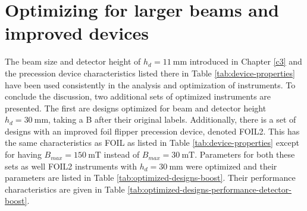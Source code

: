 \section{Optimizing for larger beams and improved devices}
The beam size and detector height of $h_d = \SI{11}{\milli\meter}$ introduced in Chapter \ref{c3} and the precession device characteristics listed there in Table \ref{tab:device-properties} have been used consistently in the analysis and optimization of instruments. To conclude the discussion, two additional sets of optimized instruments are presented. The first are designs optimized for beam and detector height $h_d = \SI{30}{\milli\meter}$, taking a B after their original labels. Additionally, there is a set of designs with an improved foil flipper precession device, denoted FOIL2. This has the same characteristics as FOIL as listed in Table \ref{tab:device-properties} except for having $B_{max} = \SI{150}{\milli\tesla}$ instead of $B_{max} = \SI{30}{\milli\tesla}$. Parameters for both these sets as well FOIL2 instruments with $h_d = \SI{30}{\milli\meter}$ were optimized and their parameters are listed in Table \ref{tab:optimized-designs-boost}. Their performance characteristics are given in Table \ref{tab:optimized-designs-performance-detector-boost}. 
